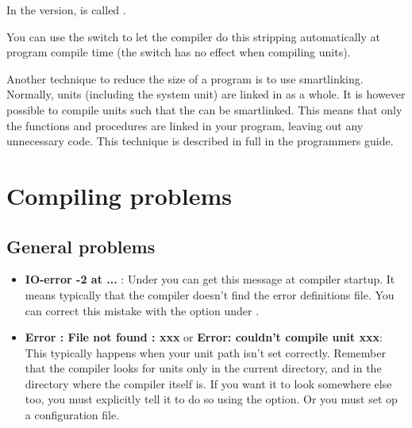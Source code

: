 \begin{remark}
In the \win version,  is called .
\end{remark}
You can use the  switch to let the compiler do this stripping
automatically at program compile time (the switch has no effect when
compiling units).

Another technique to reduce the size of a program is to use smartlinking.
Normally, units (including the system unit) are linked in as a whole.
It is however possible to compile units such that the can be smartlinked.
This means that only the functions and procedures are linked in your
program, leaving out any unnecessary code. This technique is described in
full in the programmers guide.

\chapter{Compiling problems}

\section{General problems}
\begin{itemize}
\item \textbf{IO-error -2 at ...} : Under \linux you can get this message at
compiler startup. It means typically that the compiler doesn't find the
error definitions file. You can correct this mistake with the 
option under \linux.
\item \textbf {Error : File not found : xxx} or \textbf{Error: couldn't compile
unit xxx}: This typically happens when
your unit path isn't set correctly. Remember that the compiler looks for
units only in the current directory, and in the directory where the compiler
itself is. If you want it to look somewhere else too, you must explicitly
tell it to do so using the  option. Or you must set op
a configuration file.
\end{itemize}

